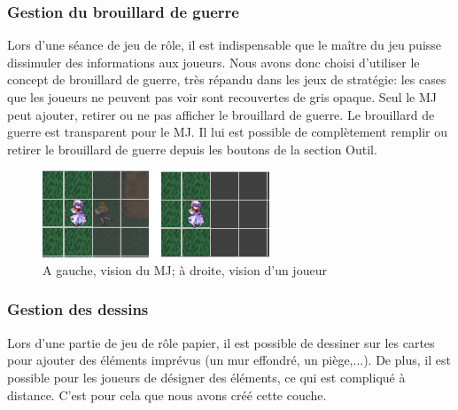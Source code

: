 \subsubsection{Gestion du brouillard de guerre}

Lors d'une séance de jeu de rôle, il est indispensable que le maître du jeu puisse dissimuler des informations aux joueurs. Nous avons donc choisi d'utiliser le concept de brouillard de guerre, très répandu dans les jeux de stratégie: les cases que les joueurs ne peuvent pas voir sont recouvertes de gris opaque. Seul le MJ peut ajouter, retirer ou ne pas afficher le brouillard de guerre. Le brouillard de guerre est transparent pour le MJ. Il lui est possible de complètement remplir ou retirer le brouillard de guerre depuis les boutons de la section Outil.


\begin{figure}[h!]
	\centering
	\includegraphics[scale=0.9]{img/FoW_Compare.png}
	\caption{A gauche, vision du MJ; à droite, vision d'un joueur}
    \label{fig:fowcompare}
\end{figure}

\subsubsection{Gestion des dessins}

Lors d'une partie de jeu de rôle papier, il est possible de dessiner sur les cartes pour ajouter des éléments imprévus (un mur effondré, un piège,...). De plus, il est possible pour les joueurs de désigner des éléments, ce qui est compliqué à distance. C'est pour cela que nous avons créé cette couche.

